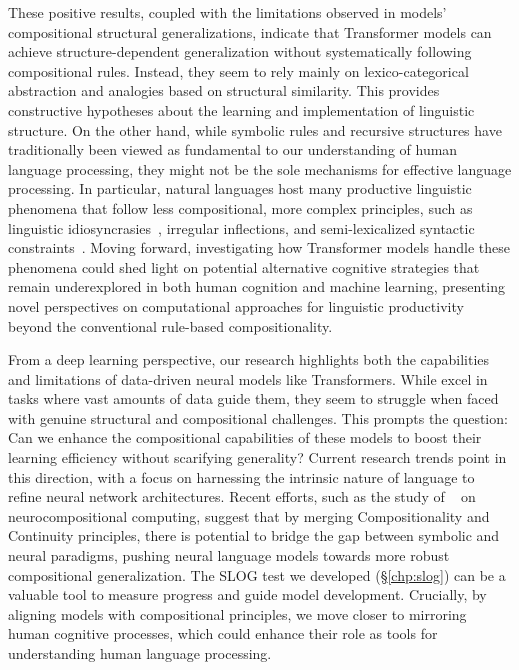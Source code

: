 These positive results, coupled with the limitations observed in models' compositional structural generalizations, indicate that Transformer models can achieve structure-dependent generalization without systematically following compositional rules. Instead, they seem to rely mainly on lexico-categorical abstraction and analogies based on structural similarity. This provides constructive hypotheses about the learning and implementation of linguistic structure. On the other hand, while symbolic rules and recursive structures have traditionally been viewed as fundamental to our understanding of human language processing, they might not be the sole mechanisms for effective language processing. In particular, natural languages host many productive linguistic phenomena that follow less compositional, more complex principles, such as linguistic idiosyncrasies~\citep{dankers-etal-2022-paradox}, irregular inflections, and semi-lexicalized syntactic constraints~\citep{goldberg2004english}. Moving forward, investigating how Transformer models handle these phenomena could shed light on potential alternative cognitive strategies that remain underexplored in both human cognition and machine learning, presenting novel perspectives on computational approaches for linguistic productivity beyond the conventional rule-based compositionality. 
 

From a deep learning perspective, our research highlights both the capabilities and limitations of data-driven neural models like Transformers. While excel in tasks where vast amounts of data guide them, they seem to struggle when faced with genuine structural and compositional challenges. This prompts the question: Can we enhance the compositional capabilities of these models to boost their learning efficiency without scarifying generality? Current research trends point in this direction, with a focus on harnessing the intrinsic nature of language to refine neural network architectures. Recent efforts, such as the study of ~\cite{smolensky2022neurocompositional} on neurocompositional computing, suggest that by merging Compositionality and Continuity principles, there is potential to bridge the gap between symbolic and neural paradigms, pushing neural language models towards more robust compositional generalization. The SLOG test we developed (\S\ref{chp:slog}) can be a valuable tool to measure progress and guide model development. Crucially, by aligning models with compositional principles, we move closer to mirroring human cognitive processes, which could enhance their role as tools for understanding human language processing.



